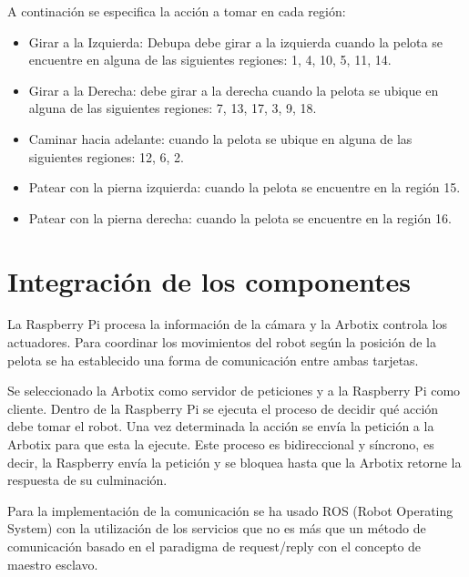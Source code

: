 \documentclass[conference, letterpaper]{IEEEtranMC1}
\begin{document}

A continaci\'on se especifica la acción a tomar en cada región:

\begin{itemize}
\item Girar a la Izquierda: Debupa debe girar a la izquierda cuando la pelota se encuentre en alguna de las siguientes regiones: 1, 4, 10, 5, 11, 14.

\item Girar a la Derecha: debe girar a la derecha cuando la pelota se ubique en alguna de las siguientes regiones: 7, 13, 17, 3, 9, 18. 

\item Caminar hacia adelante: cuando la pelota se ubique en alguna de las siguientes regiones: 12, 6, 2.

\item Patear con la pierna izquierda: cuando la pelota se encuentre en la región 15.

\item Patear con la pierna derecha: cuando la pelota se encuentre en la región 16.
\end{itemize}

\section{Integración de los componentes }
\label{sec:integracion}
La Raspberry Pi procesa la información de la cámara y la Arbotix controla los actuadores. Para coordinar los movimientos del robot según la posición de la pelota se ha establecido una forma de comunicación entre ambas tarjetas. 

Se seleccionado la Arbotix como servidor de peticiones y a la Raspberry Pi como cliente. Dentro de la Raspberry Pi se ejecuta el proceso de decidir qué acción debe tomar el robot. Una vez determinada la acción se envía la petición a la Arbotix para que esta la ejecute. Este proceso es  bidireccional y síncrono, es decir, la Raspberry envía la petición y se bloquea hasta que la Arbotix retorne la respuesta de su culminación.  

Para la implementación de la comunicación se ha usado ROS (Robot Operating System) con la utilización de los servicios que no es más que un método de comunicación basado en el paradigma de request/reply con el concepto de maestro esclavo.
\end{document}
